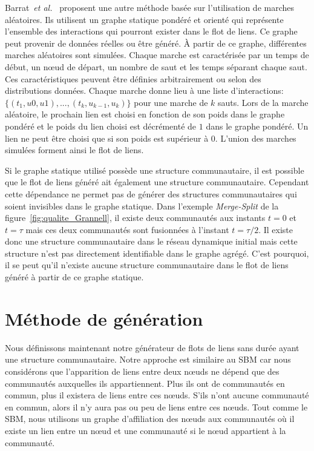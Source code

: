 Barrat~\emph{et al.}~\cite{Barrat2013a} proposent une autre méthode basée sur l'utilisation de marches aléatoires.
Ils utilisent un graphe statique pondéré et orienté qui représente l'ensemble des interactions qui pourront exister dans le flot de liens.
Ce graphe peut provenir de données réelles ou être généré.
\`A partir de ce graphe, différentes marches aléatoires sont simulées.
Chaque marche est caractérisée par un temps de début, un n\oe ud de départ, un nombre de saut et les temps séparant chaque saut.
Ces caractéristiques peuvent être définies arbitrairement ou selon des distributions données.
Chaque marche donne lieu à une liste d'interactions: $\{(t_1,u0,u1), ..., (t_k,u_{k-1}, u_k)\}$ pour une marche de $k$ sauts.
Lors de la marche aléatoire, le prochain lien est choisi en fonction de son poids dans le graphe pondéré et le poids du lien choisi est décrémenté de $1$ dans le graphe pondéré.
Un lien ne peut être choisi que si son poids est supérieur à $0$.
L'union des marches simulées forment ainsi le flot de liens.


Si le graphe statique utilisé possède une structure communautaire, il est possible que le flot de liens généré ait également une structure communautaire.
Cependant cette dépendance ne permet pas de générer des structures communautaires qui soient invisibles dans le graphe statique.
Dans l'exemple \emph{Merge-Split} de la figure~\ref{fig:qualite_Grannell}, il existe deux communautés aux instants $t=0$ et $t=\tau$ mais ces deux communautés sont fusionnées à l'instant $t=\tau/2$.
Il existe donc une structure communautaire dans le réseau dynamique initial mais cette structure n'est pas directement identifiable dans le graphe agrégé.
C'est pourquoi, il se peut qu'il n'existe aucune structure communautaire dans le flot de liens généré à partir de ce graphe statique.



\section{Méthode de génération}
\label{sec:versqualite_methode}

Nous définissons maintenant notre générateur de flots de liens sans durée ayant une structure communautaire.
Notre approche est similaire au SBM car nous considérons que l'apparition de liens entre deux n\oe uds ne dépend que des communautés auxquelles ils appartiennent.
Plus ils ont de communautés en commun, plus il existera de liens entre ces n\oe uds.
S'ils n'ont aucune communauté en commun, alors il n'y aura pas ou peu de liens entre ces n\oe uds.
Tout comme le SBM, nous utilisons un graphe d'affiliation des n\oe uds aux communautés où il existe un lien entre un n\oe ud et une communauté si le n\oe ud appartient à la communauté.

